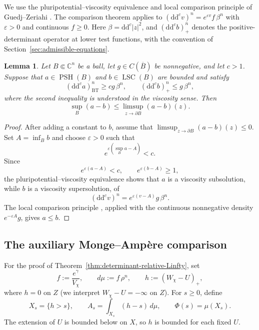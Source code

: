 \documentclass[oneside,english,letterpaper]{amsart}
\numberwithin{equation}{section}
\theoremstyle{plain}
\newtheorem{lem}[thm]{Lemma}
\theoremstyle{definition}
\theoremstyle{remark}
\renewcommand{\d}{\mathrm{d}}
\newcommand{\ddc}{\d\d^c}
\begin{document}
We use the pluripotential--viscosity equivalence and local comparison
principle of Guedj--Zeriahi
\cite[Proposition~6.21, 6.25 and Theorem~6.31]{MR3617346}.
The comparison theorem applies to
$(\ddc v)^n=e^{\varepsilon v}f\,\beta^n$
with $\varepsilon>0$ and continuous $f\geq0$.
Here $\beta=\ddc|z|^2$, and $(\ddc b)^n_+$ denotes the
positive-determinant operator at lower test functions, with the
convention of Section~\ref{sec:admissible-equations}.


\begin{lem}
	\label{lem:strict-factor-comparison}
	Let $B\Subset\mathbb C^n$ be a ball, let
	$g\in C(\overline B)$ be nonnegative, and let $c>1$.
	Suppose that $a\in\operatorname{PSH}(B)$ and
	$b\in\operatorname{LSC}(B)$ are bounded and satisfy
	$$
	(\ddc a)^n_{\mathrm{BT}}\geq cg\,\beta^n,
	\qquad
	(\ddc b)^n_+\leq g\,\beta^n,
	$$
	where the second inequality is understood in the viscosity
	sense. Then
	$$
	\sup_B(a-b)
	\leq\limsup_{z\to\partial B}(a-b)(z).
	$$
\end{lem}

\begin{proof}
After adding a constant to $b$, assume that
$\limsup_{z\to\partial B}(a-b)(z)\leq0$.
Set $A=\inf_B b$ and choose $\varepsilon>0$ such that
\[
e^{\varepsilon(\sup_B a-A)}<c.
\]
Since
\[
e^{\varepsilon(a-A)}<c,
\qquad
e^{\varepsilon(b-A)}\geq1,
\]
the pluripotential--viscosity equivalence shows that $a$ is
a viscosity subsolution, while $b$ is a viscosity supersolution, of
\[
(\ddc v)^n=e^{\varepsilon(v-A)}g\,\beta^n.
\]
The local comparison principle
\cite[Theorem~6.31]{MR3617346}, applied with the continuous
nonnegative density $e^{-\varepsilon A}g$, gives $a\leq b$.
\end{proof}

\subsection{The auxiliary Monge--Amp\`ere comparison}
\label{subsec:auxiliary-MA-comparison}

For the proof of Theorem~\ref{thm:determinant-relative-Linfty}, set
\begin{equation}
	\label{eq:singular-density-entropy}
	f:=\frac{e^\gamma}{V_\chi},
	\qquad
	d\mu:=f\,\rho^n,
	\qquad
	h:=(W_\chi-U)_+,
\end{equation}
where $h=0$ on $Z$ (we interpret $W_\chi-U=-\infty$ on $Z$). For $s\geq0$, define
\begin{equation}
	\label{eq:level-set-quantities}
	X_s=\{h>s\},
	\qquad
	A_s=\int_{X_s}(h-s)\,d\mu,
	\qquad
	\Phi(s)=\mu(X_s).
\end{equation}
The extension of $U$ is bounded below on $X$, so $h$ is bounded
for each fixed $U$. 
\end{document}
